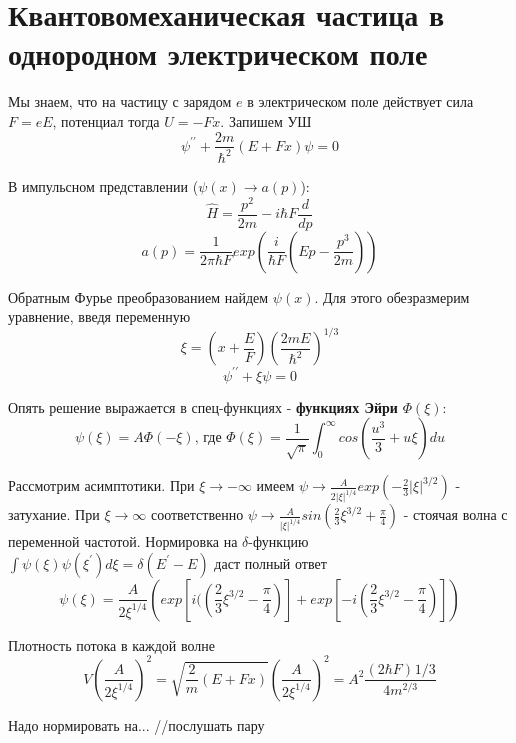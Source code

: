 \newpage
\chapter{Квантовомеханическая частица в однородном электрическом поле}
\par Мы знаем, что на частицу с зарядом $e$ в электрическом поле действует сила $F=eE$, потенциал тогда $U=-Fx$. Запишем УШ
$$\psi^{\prime \prime} + \frac{2m}{\hbar^2} \left(E+ Fx \right) \psi =0 $$
\par В импульсном представлении ($\psi(x)\rightarrow a(p)$):
$$\hat{H} = \frac{p^2}{2m}-i\hbar F \frac{d}{dp}$$
$$ a(p) = \frac{1}{2\pi\hbar F} exp \left(\frac{i}{\hbar F} (Ep - \frac{p^3}{2m}) \right)$$
\par Обратным Фурье преобразованием найдем $\psi(x)$. Для этого обезразмерим уравнение, введя переменную
$$\xi = \left(x+\frac{E}{F} \right) \left(\frac{2mE}{\hbar^2} \right)^{1/3}$$
$$\psi^{\prime \prime} + \xi \psi =0$$
\par Опять решение выражается в спец-функциях - \textbf{функциях Эйри} $\Phi (\xi)$:
$$\psi(\xi) = A \Phi (-\xi) \text{, где } \Phi (\xi) = \frac{1}{\sqrt{\pi}} \int^{\infty}_0 cos \left(\frac{u^3}{3}+ u \xi \right) du$$
\par Рассмотрим асимптотики. При $\xi \rightarrow -\infty$ имеем $ \psi \rightarrow \frac{A}{2|\xi|^{1/4}} exp \left( - \frac{2}{3} |\xi|^{3/2} \right)$ - затухание. При $\xi \rightarrow \infty$ соответственно $\psi \rightarrow \frac{A}{|\xi|^{1/4}} sin \left( \frac{2}{3} \xi^{3/2}+\frac{\pi}{4} \right)$ - стоячая волна с переменной частотой. Нормировка на $\delta$-функцию $\int \psi(\xi)\psi(\xi^{\prime}) d\xi = \delta(E^{\prime}-E)$ даст полный ответ
$$\psi(\xi) = \frac{A}{2 \xi^{1/4}} \left(exp[i(\left(\frac{2}{3} \xi^{3/2}-\frac{\pi}{4} \right)] + exp[-i\left(\frac{2}{3} \xi^{3/2}-\frac{\pi}{4} \right)] \right) $$
\par Плотность потока в каждой волне 
$$V \left( \frac{A}{2 \xi^{1/4}}\right)^2 = \sqrt{\frac{2}{m}(E+Fx)}\left( \frac{A}{2 \xi^{1/4}}\right)^2 = A^2 \frac{(2\hbar F)^{}1/3}{4m^{2/3}}$$
\par Надо нормировать на... //послушать пару